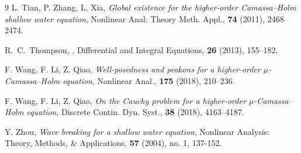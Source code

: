 \documentclass[reqno]{amsart}
\theoremstyle{plain}
\numberwithin{equation}{section}
\begin{document}
\begin{thebibliography}{9}
L. Tian, P. Zhang, L. Xia, \textit{Global existence for the higher-order Camassa–Holm shallow water equation}, Nonlinear Anal: Theory Meth. Appl., \textbf{74} (2011),
2468–2474.


R.~C.~Thompson,
,
\newblock Differential and Integral Equations, \textbf{26} (2013), 155–182.



F. Wang, F. Li, Z. Qiao, \textit{Well-posedness and peakons for a higher-order $\mu$-Camassa–Holm equation}, Nonlinear Anal., \textbf{175} (2018), 210–236.

F. Wang, F. Li, Z. Qiao, \textit{On the Cauchy problem for a higher-order $\mu$-Camassa–Holm equation}, Discrete Contin. Dyn. Syst., \textbf{38} (2018), 4163–4187.

Y. Zhou, \textit{Wave breaking for a shallow water equation}, Nonlinear Analysis: Theory, Methods, \& Applications, \textbf{57} (2004), no. 1, 137-152.

\end{thebibliography}
\end{document}

